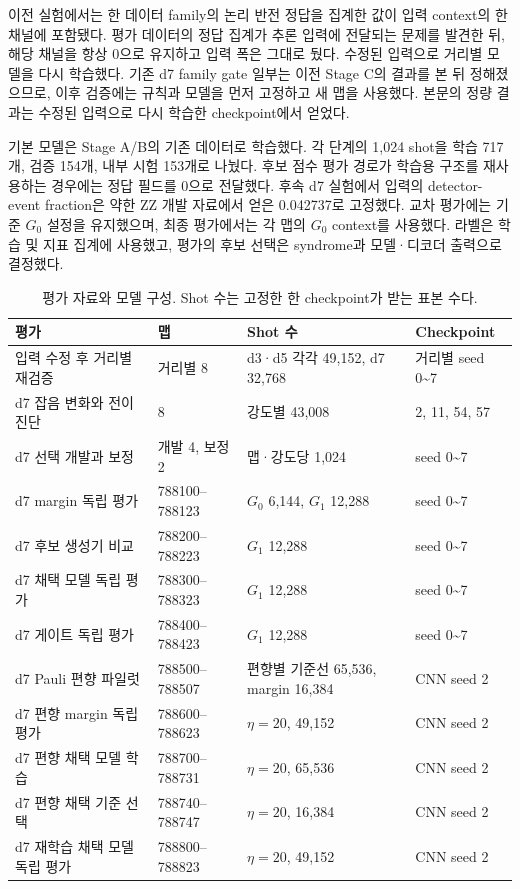 \documentclass[aps,prd,12pt,twocolumn,superscriptaddress,floatfix]{revtex4-2}
\begin{document}
이전 실험에서는 한 데이터 family의 논리 반전 정답을 집계한 값이 입력 context의 한 채널에 포함됐다. 평가 데이터의 정답 집계가 추론 입력에 전달되는 문제를 발견한 뒤, 해당 채널을 항상 0으로 유지하고 입력 폭은 그대로 뒀다. 수정된 입력으로 거리별 모델을 다시 학습했다. 기존 d7 family gate 일부는 이전 Stage C의 결과를 본 뒤 정해졌으므로, 이후 검증에는 규칙과 모델을 먼저 고정하고 새 맵을 사용했다. 본문의 정량 결과는 수정된 입력으로 다시 학습한 checkpoint에서 얻었다.

기본 모델은 Stage A/B의 기존 데이터로 학습했다. 각 단계의 1,024 shot을 학습 717개, 검증 154개, 내부 시험 153개로 나눴다. 후보 점수 평가 경로가 학습용 구조를 재사용하는 경우에는 정답 필드를 0으로 전달했다. 후속 d7 실험에서 입력의 detector-event fraction은 약한 ZZ 개발 자료에서 얻은 0.042737로 고정했다. 교차 평가에는 기준 \(G_0\) 설정을 유지했으며, 최종 평가에서는 각 맵의 \(G_0\) context를 사용했다. 라벨은 학습 및 지표 집계에 사용했고, 평가의 후보 선택은 syndrome과 모델·디코더 출력으로 결정했다.

\begin{table}[tb]
\centering
\caption{평가 자료와 모델 구성. Shot 수는 고정한 한 checkpoint가 받는 표본 수다.}
\label{tab:d7-1}
\small
\begin{tabularx}{\textwidth}{@{}>{\raggedright\arraybackslash}X l >{\raggedright\arraybackslash}X l@{}}
\toprule
평가 & 맵 & Shot 수 & Checkpoint \\
\midrule
입력 수정 후 거리별 재검증 & 거리별 8 & d3·d5 각각 49,152, d7 32,768 & 거리별 seed 0\textasciitilde{}7 \\
d7 잡음 변화와 전이 진단 & 8 & 강도별 43,008 & 2, 11, 54, 57 \\
d7 선택 개발과 보정 & 개발 4, 보정 2 & 맵·강도당 1,024 & seed 0\textasciitilde{}7 \\
d7 margin 독립 평가 & 788100--788123 & \(G_0\) 6,144, \(G_1\) 12,288 & seed 0\textasciitilde{}7 \\
d7 후보 생성기 비교 & 788200--788223 & \(G_1\) 12,288 & seed 0\textasciitilde{}7 \\
d7 채택 모델 독립 평가 & 788300--788323 & \(G_1\) 12,288 & seed 0\textasciitilde{}7 \\
d7 게이트 독립 평가 & 788400--788423 & \(G_1\) 12,288 & seed 0\textasciitilde{}7 \\
d7 Pauli 편향 파일럿 & 788500--788507 & 편향별 기준선 65,536, margin 16,384 & CNN seed 2 \\
d7 편향 margin 독립 평가 & 788600--788623 & \(\eta=20\), 49,152 & CNN seed 2 \\
d7 편향 채택 모델 학습 & 788700--788731 & \(\eta=20\), 65,536 & CNN seed 2 \\
d7 편향 채택 기준 선택 & 788740--788747 & \(\eta=20\), 16,384 & CNN seed 2 \\
d7 재학습 채택 모델 독립 평가 & 788800--788823 & \(\eta=20\), 49,152 & CNN seed 2 \\
\bottomrule
\end{tabularx}
\end{table}
\end{document}
